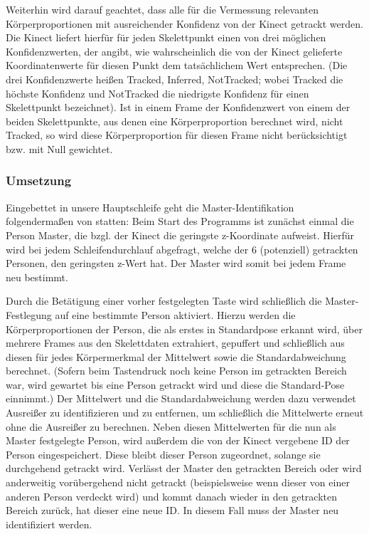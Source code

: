 \par
Weiterhin wird darauf geachtet, dass alle für die Vermessung relevanten Körperproportionen mit ausreichender Konfidenz von der Kinect getrackt werden. Die Kinect liefert hierfür für jeden Skelettpunkt einen von drei möglichen Konfidenzwerten, der angibt, wie wahrscheinlich die von der Kinect gelieferte Koordinatenwerte für diesen Punkt dem tatsächlichem Wert entsprechen. (Die drei Konfidenzwerte heißen Tracked, Inferred, NotTracked; wobei Tracked die höchste Konfidenz und NotTracked die niedrigste Konfidenz für einen Skelettpunkt bezeichnet). Ist in einem Frame der Konfidenzwert von einem der beiden Skelettpunkte, aus denen eine Körperproportion berechnet wird, nicht Tracked, so wird diese Körperproportion für diesen Frame nicht berücksichtigt bzw. mit Null gewichtet. \par
\subsubsection{Umsetzung}
Eingebettet in unsere Hauptschleife geht die Master-Identifikation folgendermaßen von statten: Beim Start des Programms ist zunächst einmal die Person Master, die bzgl. der Kinect die geringste z-Koordinate aufweist. Hierfür wird bei jedem Schleifendurchlauf abgefragt, welche der 6 (potenziell) getrackten Personen, den geringsten z-Wert hat. Der Master wird somit bei jedem Frame neu bestimmt.
\par
 Durch die Betätigung einer vorher festgelegten Taste wird schließlich die Master-Festlegung auf eine bestimmte Person aktiviert. Hierzu werden die Körperproportionen der Person, die als erstes in Standardpose erkannt wird, über mehrere Frames aus den Skelettdaten extrahiert, gepuffert und schließlich aus diesen für jedes Körpermerkmal der Mittelwert sowie die Standardabweichung berechnet. (Sofern beim Tastendruck noch keine Person im getrackten Bereich war, wird gewartet bis eine Person getrackt wird und diese die Standard-Pose einnimmt.) Der Mittelwert und die Standardabweichung werden dazu verwendet Ausreißer zu identifizieren und zu entfernen, um schließlich die Mittelwerte erneut ohne die Ausreißer zu berechnen. Neben diesen Mittelwerten für die nun als Master festgelegte Person, wird außerdem die von der Kinect vergebene ID der Person eingespeichert. Diese bleibt dieser Person zugeordnet, solange sie durchgehend getrackt wird. Verlässt der Master den getrackten Bereich oder wird anderweitig vorübergehend nicht getrackt (beispielsweise wenn dieser von einer anderen Person verdeckt wird) und kommt danach wieder in den getrackten Bereich zurück, hat dieser eine neue ID. In diesem Fall muss der Master neu identifiziert werden. 
 
